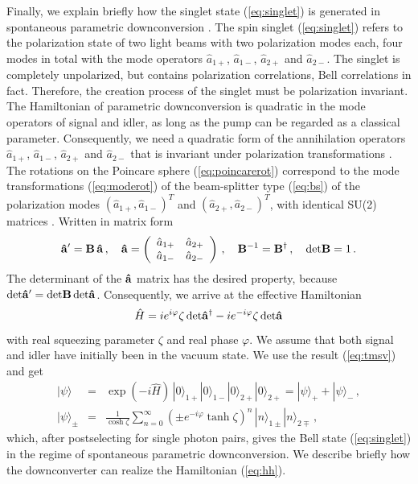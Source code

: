 \documentclass[12pt,amsmath,amssymb]{article}
\def\underline#1{{\bf #1}}
\numberwithin{equation}{section}
\begin{document}
Finally, we explain briefly how the singlet state (\ref{eq:singlet})
is generated in spontaneous parametric downconversion
\cite{MandelWolf}. The spin singlet (\ref{eq:singlet}) refers
to the polarization state of two light beams with two polarization
modes each, four modes in total with the mode operators
$\hat{a}_{1+}$, $\hat{a}_{1-}$, $\hat{a}_{2+}$ and
$\hat{a}_{2-}$. The singlet is completely unpolarized, but
contains polarization correlations, Bell correlations \cite{Bell}
in fact. Therefore, the creation process of the singlet
must be polarization invariant. The Hamiltonian of parametric
downconversion is quadratic in the mode operators
of signal and idler, as long as the pump can be regarded
as a classical parameter. Consequently, we need a quadratic form
of the annihilation operators $\hat{a}_{1+}$, $\hat{a}_{1-}$,
$\hat{a}_{2+}$ and $\hat{a}_{2-}$ that is invariant under
polarization transformations \cite{Lehner}.
The rotations on the Poincare sphere (\ref{eq:poincarerot})
correspond to the mode transformations (\ref{eq:moderot})
of the beam-splitter type (\ref{eq:bs}) of the polarization modes
$(\hat{a}_{1+}, \hat{a}_{1-})^T$ and
$(\hat{a}_{2+}, \hat{a}_{2-})^T$, with identical SU(2) matrices
\cite{Cornwell}. Written in matrix form
\begin{equation}
\underline{\hat{a}}'=\underline{B}\,\underline{\hat{a}}
\,,\quad
\underline{\hat{a}} =
\left(
    \begin{array}{cc}
      \hat{a}_{1+} & \hat{a}_{2+} \\
      \hat{a}_{1-} & \hat{a}_{2-}
    \end{array}
\right)
\,,\quad
\underline{B}^{-1}=\underline{B}^\dagger
\,,\quad
\mathrm{det}\underline{B}=1\,.
\end{equation}
The determinant of the $\underline{\hat{a}}$ matrix has the desired
property, because $\mathrm{det}\underline{\hat{a}}'=
\mathrm{det}\underline{B}\,\mathrm{det}\underline{\hat{a}}$.
Consequently, we arrive at the effective Hamiltonian
\begin{equation}
\label{eq:hh}
\hat{H} =
i e^{i\varphi}\zeta\,\mathrm{det}\underline{\hat{a}}^\dagger -
i e^{-i\varphi}\zeta\,\mathrm{det}\underline{\hat{a}}
\end{equation}
with real squeezing parameter $\zeta$ and real phase $\varphi$.
We assume that both signal and idler have initially been in the
vacuum state. We use the result (\ref{eq:tmsv}) and get
\begin{eqnarray}
|\psi\rangle &=& \exp(-i\hat{H})\,
|0\rangle_{1+}|0\rangle_{1-}|0\rangle_{2+}|0\rangle_{2+}
= |\psi\rangle_+ + |\psi\rangle_- \,,
\nonumber\\
|\psi\rangle_\pm &=&
\frac{1}{\cosh\zeta} \sum_{n=0}^\infty
\left(\pm e^{-i\varphi}\tanh\zeta\right)^n\,
|n\rangle_{1\pm} |n\rangle_{2\mp} \,,
\label{eq:polinv}
\end{eqnarray}
which, after postselecting for single photon pairs, gives
the Bell state (\ref{eq:singlet}) in the regime of spontaneous
parametric downconversion.
We describe briefly how the
downconverter can realize the Hamiltonian (\ref{eq:hh}).
\end{document}

